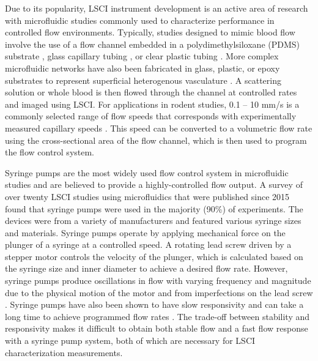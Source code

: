 \documentclass[12pt]{spieman}
\begin{document}
\begin{spacing}{2}
Due to its popularity, LSCI instrument development is an active area of research with microfluidic studies commonly used to characterize performance in controlled flow environments. Typically, studies designed to mimic blood flow involve the use of a flow channel embedded in a polydimethylsiloxane (PDMS) substrate \cite{Parthasarathy:2008el}, glass capillary tubing \cite{Arias-Cruz.2019}, or clear plastic tubing \cite{Miao:2014}. More complex microfluidic networks have also been fabricated in glass, plastic, or epoxy substrates to represent superficial heterogenous vasculature \cite{Luu.2012}. A scattering solution \cite{Parthasarathy:2008el,Arias-Cruz.2019} or whole blood \cite{Miao:2014} is then flowed through the channel at controlled rates and imaged using LSCI. For applications in rodent studies, 0.1 -- 10 mm/s is a commonly selected range of flow speeds that corresponds with experimentally measured capillary speeds \cite{Tomita:2008do}. This speed can be converted to a volumetric flow rate using the cross-sectional area of the flow channel, which is then used to program the flow control system.

Syringe pumps are the most widely used flow control system in microfluidic studies and are believed to provide a highly-controlled flow output. A survey of over twenty LSCI studies using microfluidics that were published since 2015 found that syringe pumps were used in the majority (90\%) of experiments. The devices were from a variety of manufacturers and featured various syringe sizes and materials. Syringe pumps operate by applying mechanical force on the plunger of a syringe at a controlled speed. A rotating lead screw driven by a stepper motor controls the velocity of the plunger, which is calculated based on the syringe size and inner diameter to achieve a desired flow rate. However, syringe pumps produce oscillations in flow with varying frequency and magnitude due to the physical motion of the motor and from imperfections on the lead screw \cite{Li:2014ca,Zeng.2014}. Syringe pumps have also been shown to have slow responsivity and can take a long time to achieve programmed flow rates \cite{Zhou:2011ey}. The trade-off between stability and responsivity makes it difficult \cite{Kang.2012} to obtain both stable flow and a fast flow response with a syringe pump system, both of which are necessary for LSCI characterization measurements.


\end{spacing}
\end{document}
